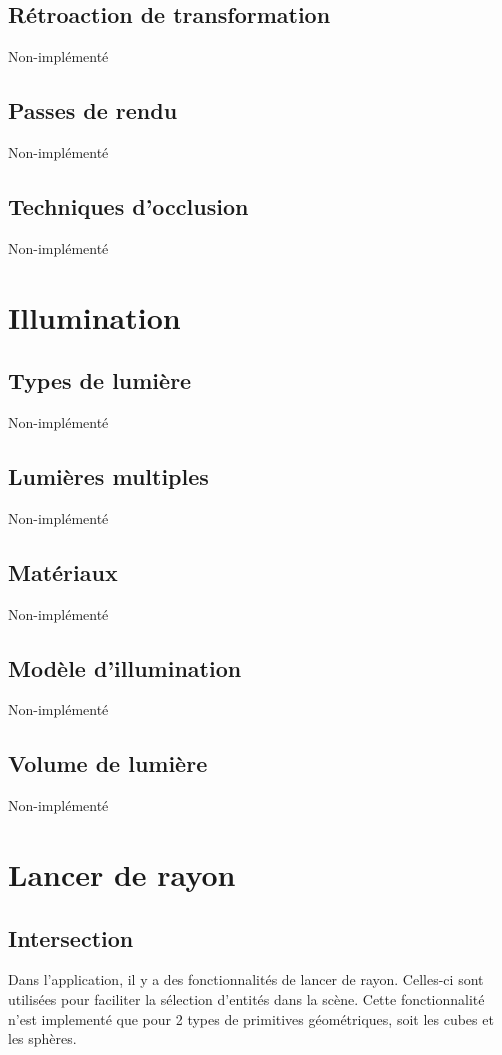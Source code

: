 \subsection{Rétroaction de transformation}
Non-implémenté

\subsection{Passes de rendu}
Non-implémenté

\subsection{Techniques d'occlusion}
Non-implémenté


\pagebreak
\section{Illumination}
\subsection{Types de lumière}
Non-implémenté

\subsection{Lumières multiples}
Non-implémenté

\subsection{Matériaux}
Non-implémenté

\subsection{Modèle d'illumination}
Non-implémenté

\subsection{Volume de lumière}
Non-implémenté


\pagebreak
\section{Lancer de rayon}
\subsection{Intersection}
Dans l'application, il y a des fonctionnalités de lancer de rayon. Celles-ci sont utilisées pour faciliter la sélection d'entités dans la scène. Cette fonctionnalité n'est implementé que pour 2 types de primitives géométriques, soit les cubes et les sphères.

